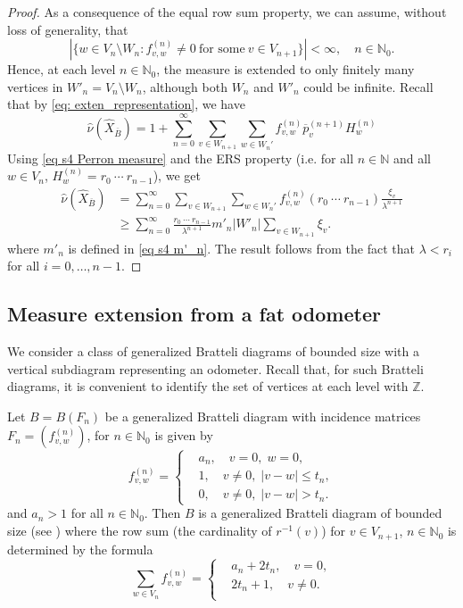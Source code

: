 \documentclass[11pt,reqno]{amsart}
\theoremstyle{definition}
\theoremstyle{remark}
\theoremstyle{plain}
\def\ov{\overline}
\def\wh{\widehat}
\newcommand{\N}{\mathbb N}
\newcommand{\Z}{\mathbb Z}
\newcommand{\be}{\begin{equation}}
\newcommand{\ee}{\end{equation}}
\numberwithin{equation}{section}
\begin{document}
\begin{proof} As a consequence of the equal row sum property, we can assume, without loss of generality, that 
\be\label{eq W'_n finite}
|\{w \in V_n \setminus W_n : f^{(n)}_{v,w} \neq 0\ \mbox{for\ some} \ v \in V_{n+1}\}| < \infty, \quad n\in \N_0.
\ee
Hence, at each level $n \in \N_0$, the measure is extended to only finitely many vertices in $W'_n = V_n \setminus W_n$, although both $W_n$ and $W'_n$ could be infinite. Recall that by \eqref{eq: exten_representation}, we have
$$
\wh \nu(\wh X_{\ov B}) =  
1 + \sum_{n = 0}^{\infty} \sum_{v \in W_{n+1}}\sum_{w \in W_n'}f_{v,w}^{(n)}\ov p_v^{(n+1)}H_w^{(n)}
$$ 
Using \eqref{eq s4 Perron measure} and the ERS property (i.e. for all $n\in \N$ and all $w \in V_n$, $H_w^{(n)} = r_0 \ \cdots \ r_{n-1}$), we get
\begin{align*}
    \wh \nu(\wh X_{\ov B}) & = \sum_{n = 0}^{\infty} \sum_{v \in W_{n+1}}\sum_{w \in W_n'} f_{v,w}^{(n)} 
(r_0 \ \cdots \ r_{n-1}) \frac{\xi_v}{\lambda^{n+1}}\\
&\geq \sum_{n = 0}^{\infty} \frac{r_0 \ \cdots \ r_{n-1}}{\lambda^{n+1}} 
m'_n |W'_n| \sum_{v \in W_{n+1}} \xi_v. 
\end{align*} 
where $m'_n$ is defined in \eqref{eq s4 m'_n}. The result follows from the fact that $\lambda  < r_i$ for all 
$i = 0, \ldots, n-1$.
\end{proof}

\subsection{Measure extension from a fat odometer}\label{sec: fat odometer} 
We consider a class of generalized Bratteli diagrams of bounded size with a vertical subdiagram representing an odometer. Recall that, for such Bratteli diagrams, it is convenient to identify the set of vertices at each level with $\Z$.

Let $B = B(F_n)$ be a generalized Bratteli diagram with incidence matrices $F_n = (f_{v,w}^{(n)})$, for $n \in \N_0$ is given by
\begin{equation}\label{eq: fat_odo}
f_{v,w}^{(n)} =
\left\{
\begin{aligned}
&a_n, \quad v = 0,\;  w = 0,\\
&1, \quad v \neq 0,\;  |v - w| \leq t_n,\\
&0, \quad v \neq 0, \; |v - w| > t_n.
\end{aligned}
\right.
\end{equation}
and $a_n > 1$ for all $n \in \N_0$.
Then $B$ is a generalized Bratteli diagram of bounded size (see ) where the row sum (the cardinality of $r^{-1}(v)$) for $v \in V_{n+1}$, $n \in \N_0$ is determined 
by the formula 
$$
\sum_{w \in V_n} f_{v,w}^{(n)} =
\left\{
\begin{aligned}
&a_n + 2 t_n, \quad v = 0,\\
&2t_n + 1, \quad v \neq 0.\\
\end{aligned}
\right.
$$
\end{document}
